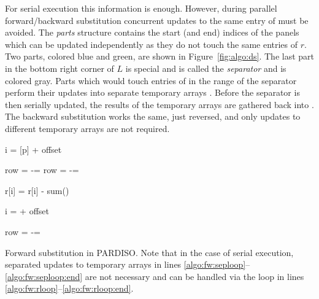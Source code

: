 For serial execution this information is enough. 
However, during parallel forward/backward substitution concurrent updates to
the same entry of \vr{} must be avoided.
The \textit{parts} structure contains the start (and end) indices of the panels which can
be updated independently as they do not touch the same entries of $r$.
Two parts, colored blue and green, are shown in Figure~\ref{fig:algo:ds}.
The last part in the bottom right corner of $L$ is special and is called the 
\textit{separator} and is colored gray.
%
Parts which would touch entries of \vr{} in the range of the separator perform 
their updates into separate temporary arrays \vtemp{}.
Before the separator is then serially updated, the results of the temporary
arrays are gathered back into \vr{}. 
The backward substitution works the same, just reversed, and
only updates to different temporary arrays are not required.

\begin{algorithm}[t]
  \begin{algorithmic}[1]
       
          \For{\textcolor{blue}{column $j$ in panel p}}  \label{alg:fw:1}
            \State i = \nxindx{}[p] + offset
          
            \label{algo:fw:rloop}
                \State row = \nindx[i++]
                \State \nr[row] -=  \nr[j] \nlnz[k]  
            \EndFor\label{algo:fw:rloop:end}
            \label{algo:fw:seploop}
                \State row = \nindx[i++]
                \State \ntemp[row,p] -=  \nr[j] \nlnz[k] 
            \EndFor\label{algo:fw:seploop:end}
          \EndFor
        \EndFor
      \EndFor

      \State
      \State r[i] = r[i] - sum(\ntemp[i,:])  
      \State

       
        \For{\textcolor{blue}{column $j$ in panel p}} \label{alg:fw:2}
            \State i = \nxindx[p] + offset
          
                \State row = \nindx[i++]
                \State \nr[row] -=  \nr[j] \nlnz[k] 
            \EndFor
        \EndFor
      \EndFor
    \EndProcedure
  \end{algorithmic}
  \caption{Forward substitution in PARDISO. Note that in the case of serial
execution, separated updates to temporary arrays in lines
\ref{algo:fw:seploop}--\ref{algo:fw:seploop:end} are not necessary
and can be handled via the loop in lines
\ref{algo:fw:rloop}--\ref{algo:fw:rloop:end}.}
  \label{alg:algo:fw}
\end{algorithm}

